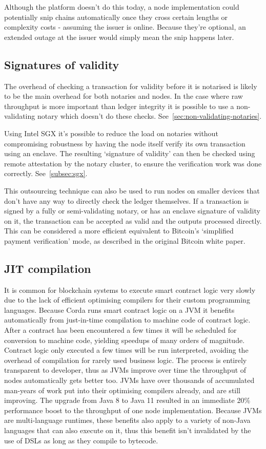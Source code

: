 \documentclass{article}
\begin{document}
Although the platform doesn't do this today, a node implementation could potentially snip chains automatically once
they cross certain lengths or complexity costs - assuming the issuer is online. Because they're optional, an extended
outage at the issuer would simply mean the snip happens later.

\subsection{Signatures of validity}

The overhead of checking a transaction for validity before it is notarised is likely to be the main overhead for
both notaries and nodes. In the case where raw throughput is more important than ledger integrity it is possible to use a
non-validating notary which doesn't do these checks. See~\cref{sec:non-validating-notaries}.

Using Intel SGX it's possible to reduce the load on notaries without compromising robustness by having the node itself
verify its own transaction using an enclave. The resulting `signature of validity' can then be checked using remote
attestation by the notary cluster, to ensure the verification work was done correctly. See~\cref{subsec:sgx}.

This outsourcing technique can also be used to run nodes on smaller devices that don't have any way to directly check
the ledger themselves. If a transaction is signed by a fully or semi-validating notary, or has an enclave signature of
validity on it, the transaction can be accepted as valid and the outputs processed directly. This can be considered
a more efficient equivalent to Bitcoin's `simplified payment verification' mode, as described in the original Bitcoin
white paper.

\subsection{JIT compilation}

It is common for blockchain systems to execute smart contract logic very slowly due to the lack of efficient
optimising compilers for their custom programming languages. Because Corda runs smart contract logic on a JVM it
benefits automatically from just-in-time compilation to machine code of contract logic. After a contract has been
encountered a few times it will be scheduled for conversion to machine code, yielding speedups of many orders of
magnitude. Contract logic only executed a few times will be run interpreted, avoiding the overhead of
compilation for rarely used business logic. The process is entirely transparent to developer, thus as JVMs improve
over time the throughput of nodes automatically gets better too. JVMs have over thousands of accumulated man-years
of work put into their optimising compilers already, and are still improving. The upgrade from Java 8 to Java 11
resulted in an immediate 20\% performance boost to the throughput of one node implementation. Because JVMs are
multi-language runtimes, these benefits also apply to a variety of non-Java languages that can also execute on it,
thus this benefit isn't invalidated by the use of DSLs as long as they compile to bytecode.
\end{document}
